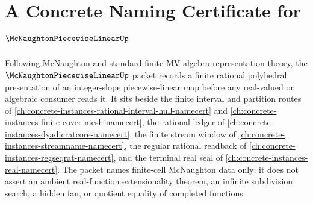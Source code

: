 \chapter{A Concrete Naming Certificate for $\McNaughtonPiecewiseLinearUp$}
\label{ch:concrete-instances-mcnaughton-piecewise-linear-namecert}

Following McNaughton and standard finite MV-algebra representation theory, the $\McNaughtonPiecewiseLinearUp$ packet records a finite rational polyhedral presentation of an integer-slope piecewise-linear map before any real-valued or algebraic consumer reads it. It sits beside the finite interval and partition routes of \autoref{ch:concrete-instances-rational-interval-hull-namecert} and \autoref{ch:concrete-instances-finite-cover-mesh-namecert}, the rational ledger of \autoref{ch:concrete-instances-dyadicratcore-namecert}, the finite stream window of \autoref{ch:concrete-instances-streamname-namecert}, the regular rational readback of \autoref{ch:concrete-instances-regseqrat-namecert}, and the terminal real seal of \autoref{ch:concrete-instances-real-namecert}. The packet names finite-cell McNaughton data only; it does not assert an ambient real-function extensionality theorem, an infinite subdivision search, a hidden fan, or quotient equality of completed functions.

